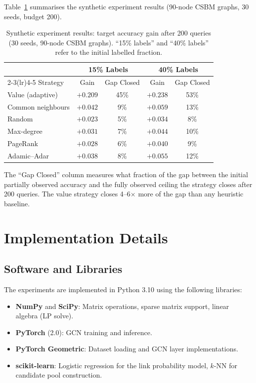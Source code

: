 \documentclass[12pt,a4paper,oneside]{report}
\begin{document}
Table~\ref{tab:synth_detail} summarises the synthetic experiment results (90-node CSBM graphs, 30 seeds, budget 200).

\begin{table}[htbp]
\centering
\caption{Synthetic experiment results: target accuracy gain after 200 queries (30 seeds, 90-node CSBM graphs). ``15\% labels'' and ``40\% labels'' refer to the initial labelled fraction.}
\label{tab:synth_detail}
\small
\begin{tabular}{lcccc}
\toprule
 & \multicolumn{2}{c}{15\% Labels} & \multicolumn{2}{c}{40\% Labels} \\
\cmidrule(lr){2-3}\cmidrule(lr){4-5}
Strategy & Gain & Gap Closed & Gain & Gap Closed \\
\midrule
Value (adaptive) & $+0.209$ & 45\% & $+0.238$ & 53\% \\
Common neighbours & $+0.042$ & 9\% & $+0.059$ & 13\% \\
Random & $+0.023$ & 5\% & $+0.034$ & 8\% \\
Max-degree & $+0.031$ & 7\% & $+0.044$ & 10\% \\
PageRank & $+0.028$ & 6\% & $+0.040$ & 9\% \\
Adamic--Adar & $+0.038$ & 8\% & $+0.055$ & 12\% \\
\bottomrule
\end{tabular}
\end{table}

The ``Gap Closed'' column measures what fraction of the gap between the initial partially observed accuracy and the fully observed ceiling the strategy closes after 200 queries. The value strategy closes 4--6$\times$ more of the gap than any heuristic baseline.


\chapter{Implementation Details}
\label{app:implementation}

\section{Software and Libraries}

The experiments are implemented in Python 3.10 using the following libraries:
\begin{itemize}[leftmargin=2em]
    \item \textbf{NumPy} and \textbf{SciPy}: Matrix operations, sparse matrix support, linear algebra (LP solve).
    \item \textbf{PyTorch} (2.0): GCN training and inference.
    \item \textbf{PyTorch Geometric}: Dataset loading and GCN layer implementations.
    \item \textbf{scikit-learn}: Logistic regression for the link probability model, $k$-NN for candidate pool construction.
\end{itemize}
\end{document}

